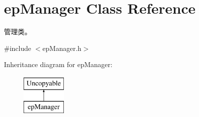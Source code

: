 \hypertarget{classepManager}{\section{ep\-Manager \-Class \-Reference}
\label{classepManager}
}


管理类。  




{\ttfamily \#include $<$ep\-Manager.\-h$>$}

\-Inheritance diagram for ep\-Manager\-:\begin{figure}[H]
\begin{center}
\leavevmode
\includegraphics[height=2.000000cm]{classepManager}
\end{center}
\end{figure}
